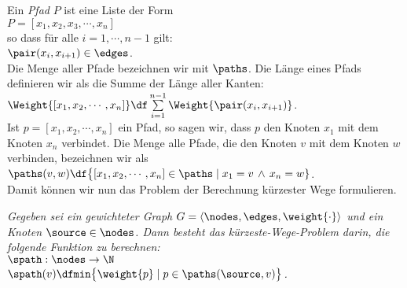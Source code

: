 \noindent
Ein \emph{Pfad} $P$ ist eine Liste der Form \\[0.2cm]
\hspace*{1.3cm} $P = [ x_1, x_2, x_3, \cdots, x_n ]$ \\[0.2cm]
so dass f\"ur alle $i = 1, \cdots, n-1$ gilt: \\[0.2cm]
\hspace*{1.3cm} $\pair(x_i,x_{i+1}) \in \edges$. \\[0.2cm]
Die Menge aller Pfade bezeichnen wir mit $\paths$.
Die L\"ange eines Pfads definieren wir als die Summe der L\"ange aller Kanten:
\\[0.2cm]
\hspace*{1.3cm} $\Weight{[x_1,x_2, \cdots, x_n]} \df \sum\limits_{i=1}^{n-1} \Weight{\pair(x_i,x_{i+1})}$. \\[0.2cm]
Ist $p = [x_1, x_2, \cdots, x_n]$ ein Pfad, so sagen wir, dass $p$ den Knoten $x_1$ mit dem
Knoten $x_n$ verbindet.   Die Menge alle Pfade, die den Knoten $v$ mit dem Knoten $w$
verbinden, bezeichnen wir als \\[0.2cm]
\hspace*{1.3cm} 
 $\paths(v,w) \df \bigl\{ [x_1, x_2, \cdots, x_n] \in \paths \mid x_1 = v \,\wedge\, x_n = w \}$.
\\[0.2cm]
Damit k\"onnen wir nun das Problem der Berechnung k\"urzester Wege formulieren.
\begin{Definition}
{\em
  Gegeben sei ein gewichteter Graph $G = \langle \nodes, \edges, \weight{\cdot} \rangle$ 
  und ein  Knoten $\source \in \nodes$.  Dann besteht das 
  {\em k\"urzeste-Wege-Problem}  darin, die folgende Funktion zu berechnen: \\[0.2cm]
  \hspace*{1.3cm} $\spath: \nodes \rightarrow \N$ \\[0.1cm]
  \hspace*{1.3cm} $\spath(v) \df \mathtt{min}\bigl\{ \weight{p} \mid p \in \paths(\source,v) \bigr\}$.
  \conclude  
}
\end{Definition}

